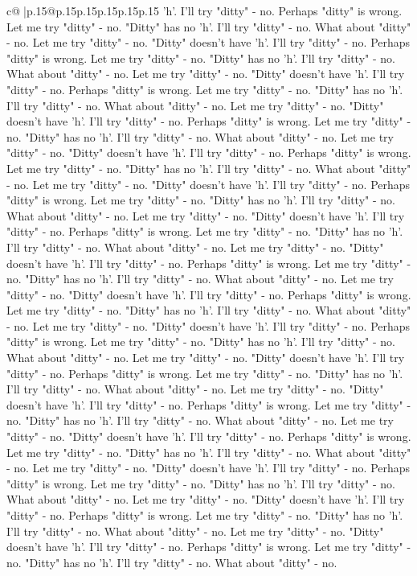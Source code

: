 \documentclass{article}
\begin{document}
{\begin{supertabular}{c@{$\;$}|p{.15\linewidth}@{}p{.15\linewidth}p{.15\linewidth}p{.15\linewidth}p{.15\linewidth}p{.15\linewidth}}
{{{'h'. I'll try "ditty" {-} no. Perhaps "ditty" is wrong. Let me try "ditty" {-} no. "Ditty" has no 'h'. I'll try "ditty" {-} no. What about "ditty" {-} no. Let me try "ditty" {-} no. "Ditty" doesn't have 'h'. I'll try "ditty" {-} no. Perhaps "ditty" is wrong. Let me try "ditty" {-} no. "Ditty" has no 'h'. I'll try "ditty" {-} no. What about "ditty" {-} no. Let me try "ditty" {-} no. "Ditty" doesn't have 'h'. I'll try "ditty" {-} no. Perhaps "ditty" is wrong. Let me try "ditty" {-} no. "Ditty" has no 'h'. I'll try "ditty" {-} no. What about "ditty" {-} no. Let me try "ditty" {-} no. "Ditty" doesn't have 'h'. I'll try "ditty" {-} no. Perhaps "ditty" is wrong. Let me try "ditty" {-} no. "Ditty" has no 'h'. I'll try "ditty" {-} no. What about "ditty" {-} no. Let me try "ditty" {-} no. "Ditty" doesn't have 'h'. I'll try "ditty" {-} no. Perhaps "ditty" is wrong. Let me try "ditty" {-} no. "Ditty" has no 'h'. I'll try "ditty" {-} no. What about "ditty" {-} no. Let me try "ditty" {-} no. "Ditty" doesn't have 'h'. I'll try "ditty" {-} no. Perhaps "ditty" is wrong. Let me try "ditty" {-} no. "Ditty" has no 'h'. I'll try "ditty" {-} no. What about "ditty" {-} no. Let me try "ditty" {-} no. "Ditty" doesn't have 'h'. I'll try "ditty" {-} no. Perhaps "ditty" is wrong. Let me try "ditty" {-} no. "Ditty" has no 'h'. I'll try "ditty" {-} no. What about "ditty" {-} no. Let me try "ditty" {-} no. "Ditty" doesn't have 'h'. I'll try "ditty" {-} no. Perhaps "ditty" is wrong. Let me try "ditty" {-} no. "Ditty" has no 'h'. I'll try "ditty" {-} no. What about "ditty" {-} no. Let me try "ditty" {-} no. "Ditty" doesn't have 'h'. I'll try "ditty" {-} no. Perhaps "ditty" is wrong. Let me try "ditty" {-} no. "Ditty" has no 'h'. I'll try "ditty" {-} no. What about "ditty" {-} no. Let me try "ditty" {-} no. "Ditty" doesn't have 'h'. I'll try "ditty" {-} no. Perhaps "ditty" is wrong. Let me try "ditty" {-} no. "Ditty" has no 'h'. I'll try "ditty" {-} no. What about "ditty" {-} no. Let me try "ditty" {-} no. "Ditty" doesn't have 'h'. I'll try "ditty" {-} no. Perhaps "ditty" is wrong. Let me try "ditty" {-} no. "Ditty" has no 'h'. I'll try "ditty" {-} no. What about "ditty" {-} no. Let me try "ditty" {-} no. "Ditty" doesn't have 'h'. I'll try "ditty" {-} no. Perhaps "ditty" is wrong. Let me try "ditty" {-} no. "Ditty" has no 'h'. I'll try "ditty" {-} no. What about "ditty" {-} no. Let me try "ditty" {-} no. "Ditty" doesn't have 'h'. I'll try "ditty" {-} no. Perhaps "ditty" is wrong. Let me try "ditty" {-} no. "Ditty" has no 'h'. I'll try "ditty" {-} no. What about "ditty" {-} no. Let me try "ditty" {-} no. "Ditty" doesn't have 'h'. I'll try "ditty" {-} no. Perhaps "ditty" is wrong. Let me try "ditty" {-} no. "Ditty" has no 'h'. I'll try "ditty" {-} no. What about "ditty" {-} no. Let me try "ditty" {-} no. "Ditty" doesn't have 'h'. I'll try "ditty" {-} no. Perhaps "ditty" is wrong. Let me try "ditty" {-} no. "Ditty" has no 'h'. I'll try "ditty" {-} no. What about "ditty" {-} no. Let me try "ditty" {-} no. "Ditty" doesn't have 'h'. I'll try "ditty" {-} no. Perhaps "ditty" is wrong. Let me try "ditty" {-} no. "Ditty" has no 'h'. I'll try "ditty" {-} no. What about "ditty" {-} no. }}}
\end{supertabular}}
\end{document}

